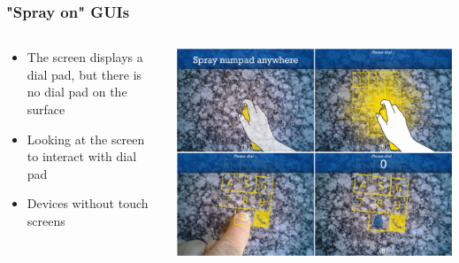 \documentclass{beamer}
\begin{document}
\begin{frame}
	\frametitle{"Spray on" GUIs}	
	\begin{columns}
	\begin{column}{0.45\textwidth}
	\begin{itemize}
		\item The screen displays a dial pad, but there is no dial pad on the surface
		\item Looking at the screen to interact with dial pad
		\item Devices without touch screens
	\end{itemize}		
	\end{column}
	\begin{column}{0.55\textwidth}
	\includegraphics[width=\textwidth]{../Sample_paper/images/numpad}
	
	\cite{3D}
	\end{column}
	\end{columns}
\end{frame}
\end{document}
